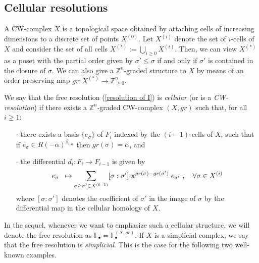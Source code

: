 \documentclass[12pt]{amsart}
\theoremstyle{definition}
\theoremstyle{remark}
\numberwithin{equation}{section}
\newcommand{\bZ}{{\mathbb{Z}}}
\newcommand{\lra}{{\longrightarrow}}
\newcommand{\phil}[1]{{\color{red} \sf $\star\star$ Philippe: [#1]}}
\begin{document}
\vskip 2mm

\subsection{Cellular resolutions}

A CW-complex $X$ is a topological space obtained by attaching cells of increasing dimensions
to a discrete %
set of points $X^{(0)}$.  Let $X^{(i)}$ denote the set of $i$-cells of  $X$ and
consider the set of all cells $X^{(\ast)}:=\bigcup_{i\geq 0} X^{(i)}$. Then, we can view $X^{(\ast)}$
as a poset with the partial order  given by $\sigma' \leq \sigma$ if and only if $\sigma'$
is contained in the closure of $\sigma$. We can also give a $\bZ^n$-graded structure to $X$ by means of an
order preserving map $gr: X^{(\ast)} \lra \bZ_{\geq 0}^n$.




\vskip 2mm

We say that the free resolution (\ref{resolution of I}) is {\it cellular} (or is a {\it CW-resolution})
if there exists a $\bZ^n$-graded CW-complex $(X, gr)$ such that, for all $i\geq 1$:

\begin{itemize}
 \item[$\cdot$]
 there exists a basis $\{e_\sigma\}$ of $F_i$ indexed by the $(i-1)$-cells of $X$, such that if
 $e_\sigma \in R(-\alpha)^{\beta_{i,\alpha}}$ then  $gr(\sigma)=\alpha$, and


 \item[$\cdot$]
the differential $d_i: F_i\longrightarrow F_{i-1}$ is given
by
 $$e_\sigma \hskip 2mm \mapsto \sum_{\sigma \geq \sigma' \in X^{(i-1)}} [\sigma: \sigma'] \hskip 1mm {\bf x}^{gr(\sigma) - gr(\sigma') } \hskip 1mm e_{\sigma'}\ ,\quad \forall \sigma \in X^{(i)}$$
where $[\sigma: \sigma']$ denotes the coefficient of $\sigma'$ in the image of $\sigma$ by the differential map in the cellular homology
of $X$.
\end{itemize}
In the sequel, whenever we want to emphasize such a cellular structure, we will denote the free resolution as
$\mathbb{F}_{\bullet}=\mathbb{F}_{\bullet}^{(X,gr)}$. If $X$ is a simplicial complex, we say
that the free resolution is {\it simplicial}. This is the case for the following two well-known examples.
\end{document}
